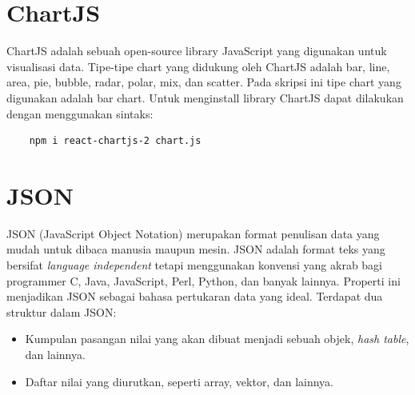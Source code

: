 \section{ChartJS}
ChartJS adalah sebuah open-source library JavaScript yang digunakan untuk visualisasi data. Tipe-tipe chart yang didukung oleh ChartJS adalah bar, line, area, pie, bubble, radar, polar, mix, dan scatter. Pada skripsi ini tipe chart yang digunakan adalah bar chart. Untuk menginstall library ChartJS dapat dilakukan dengan menggunakan sintaks:
\begin{verbatim}
	npm i react-chartjs-2 chart.js
\end{verbatim}

\section{JSON}
JSON (JavaScript Object Notation) merupakan format penulisan data yang mudah untuk dibaca manusia maupun mesin. JSON adalah format teks yang bersifat \textit{language independent} tetapi menggunakan konvensi yang akrab bagi programmer C, Java, JavaScript, Perl, Python, dan banyak lainnya. Properti ini menjadikan JSON sebagai bahasa pertukaran data yang ideal. Terdapat dua struktur dalam JSON:
\begin{itemize}
    \item Kumpulan pasangan nilai yang akan dibuat menjadi sebuah objek, \textit{hash table}, dan lainnya.
    \item Daftar nilai yang diurutkan, seperti array, vektor, dan lainnya.
\end{itemize}
